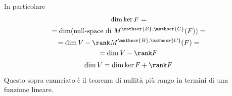 \documentclass[twoside, 11pt, titlepage]{article}
\begin{document}
In particolare 
\begin{multline*}
 \dim\ker F = \\
 = \dim(\text{null-space di } M^{\mathscr{B}, \mathscr{C}}(F))=\\
 = \dim V - \rank M^{\mathscr{B}, \mathscr{C}}(F) =\\
 = \dim V- \rank F 
\end{multline*}
\[
	\dim V = \dim \ker F + \rank F
\]

Questo sopra enunciato è il teorema di nullità più rango in termini di una funzione lineare.

\end{document}
